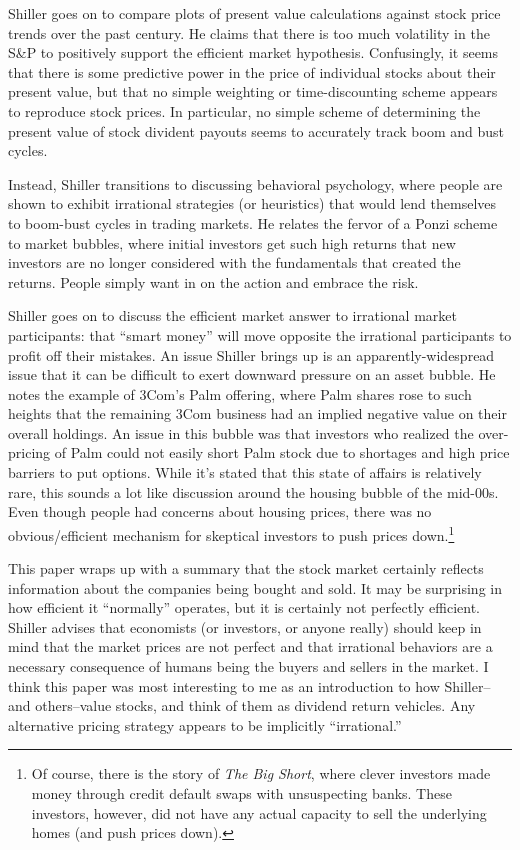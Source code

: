 \documentclass{article}
\begin{document}
Shiller goes on to compare plots of present value calculations against stock price trends over the past century.  He claims that there is too much volatility in the S\&P to positively support the efficient market hypothesis.  Confusingly, it seems that there is some predictive power in the price of individual stocks about their present value, but that no simple weighting or time-discounting scheme appears to reproduce stock prices.  In particular, no simple scheme of determining the present value of stock divident payouts seems to accurately track boom and bust cycles.

Instead, Shiller transitions to discussing behavioral psychology, where people are shown to exhibit irrational strategies (or heuristics) that would lend themselves to boom-bust cycles in trading markets.  He relates the fervor of a Ponzi scheme to market bubbles, where initial investors get such high returns that new investors are no longer considered with the fundamentals that created the returns.  People simply want in on the action and embrace the risk.

Shiller goes on to discuss the efficient market answer to irrational market participants: that ``smart money'' will move opposite the irrational participants to profit off their mistakes.  An issue Shiller brings up is an apparently-widespread issue that it can be difficult to exert downward pressure on an asset bubble.  He notes the example of 3Com's Palm offering, where Palm shares rose to such heights that the remaining 3Com business had an implied negative value on their overall holdings.  An issue in this bubble was that investors who realized the over-pricing of Palm could not easily short Palm stock due to shortages and high price barriers to put options.  While it's stated that this state of affairs is relatively rare, this sounds a lot like discussion around the housing bubble of the mid-00s.  Even though people had concerns about housing prices, there was no obvious/efficient mechanism for skeptical investors to push prices down.\footnote{Of course, there is the story of {\it The Big Short}, where clever investors made money through credit default swaps with unsuspecting banks.  These investors, however, did not have any actual capacity to sell the underlying homes (and push prices down).}

This paper wraps up with a summary that the stock market certainly reflects information about the companies being bought and sold.  It may be surprising in how efficient it ``normally'' operates, but it is certainly not perfectly efficient.  Shiller advises that economists (or investors, or anyone really) should keep in mind that the market prices are not perfect and that irrational behaviors are a necessary consequence of humans being the buyers and sellers in the market.  I think this paper was most interesting to me as an introduction to how Shiller--and others--value stocks, and think of them as dividend return vehicles.  Any alternative pricing strategy appears to be implicitly ``irrational.''
\end{document}
